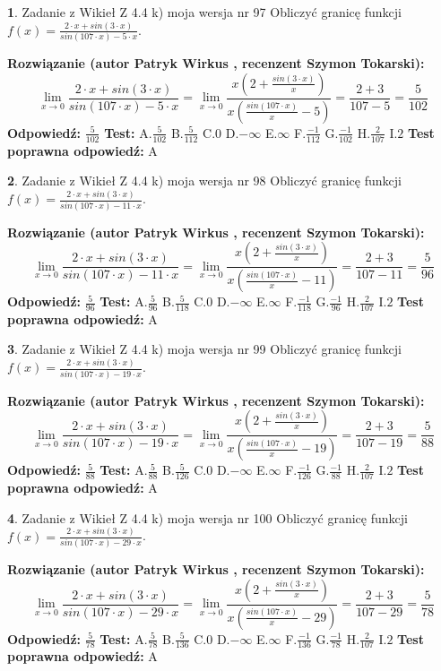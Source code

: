 \documentclass[12pt, a4paper]{article}
\theoremstyle{definition} %
\newtheorem{zad}{}
\newcommand{\zadStart}[1]{\begin{zad}#1\newline}
\newcommand{\zadStop}{\end{zad}}
\newcommand{\rozwStart}[2]{\noindent \textbf{Rozwiązanie (autor #1 , recenzent #2): }\newline}
\newcommand{\rozwStop}{\newline}
\newcommand{\odpStart}{\noindent \textbf{Odpowiedź:}\newline}
\newcommand{\odpStop}{\newline}
\newcommand{\testStart}{\noindent \textbf{Test:}\newline}
\newcommand{\testStop}{\newline}
\newcommand{\kluczStart}{\noindent \textbf{Test poprawna odpowiedź:}\newline}
\newcommand{\kluczStop}{\newline}
\begin{document}
\zadStart{Zadanie z Wikieł Z 4.4 k) moja wersja nr 97}
Obliczyć granicę funkcji $f(x)=\frac{2\cdot x +sin(3\cdot x)}{sin(107\cdot x) -5\cdot x}$.
\zadStop
\rozwStart{Patryk Wirkus}{Szymon Tokarski}
$$\lim\limits_{x\to 0}\frac{2\cdot x +sin(3\cdot x)}{sin(107\cdot x) -5\cdot x}
=\lim\limits_{x\to 0}\frac{x(2+\frac{sin(3\cdot x)}{x})}{x(\frac{sin(107\cdot x)}{x}-5)}
=\frac{2+3}{107-5} = \frac{5}{102}$$
\rozwStop
\odpStart
$\frac{5}{102}$
\odpStop
\testStart
A.$\frac{5}{102}$
B.$\frac{5}{112}$
C.$0$
D.$-\infty$
E.$\infty$
F.$\frac{-1}{112}$
G.$\frac{-1}{102}$
H.$\frac{2}{107}$
I.$2$
\testStop
\kluczStart
A
\kluczStop



\zadStart{Zadanie z Wikieł Z 4.4 k) moja wersja nr 98}
Obliczyć granicę funkcji $f(x)=\frac{2\cdot x +sin(3\cdot x)}{sin(107\cdot x) -11\cdot x}$.
\zadStop
\rozwStart{Patryk Wirkus}{Szymon Tokarski}
$$\lim\limits_{x\to 0}\frac{2\cdot x +sin(3\cdot x)}{sin(107\cdot x) -11\cdot x}
=\lim\limits_{x\to 0}\frac{x(2+\frac{sin(3\cdot x)}{x})}{x(\frac{sin(107\cdot x)}{x}-11)}
=\frac{2+3}{107-11} = \frac{5}{96}$$
\rozwStop
\odpStart
$\frac{5}{96}$
\odpStop
\testStart
A.$\frac{5}{96}$
B.$\frac{5}{118}$
C.$0$
D.$-\infty$
E.$\infty$
F.$\frac{-1}{118}$
G.$\frac{-1}{96}$
H.$\frac{2}{107}$
I.$2$
\testStop
\kluczStart
A
\kluczStop



\zadStart{Zadanie z Wikieł Z 4.4 k) moja wersja nr 99}
Obliczyć granicę funkcji $f(x)=\frac{2\cdot x +sin(3\cdot x)}{sin(107\cdot x) -19\cdot x}$.
\zadStop
\rozwStart{Patryk Wirkus}{Szymon Tokarski}
$$\lim\limits_{x\to 0}\frac{2\cdot x +sin(3\cdot x)}{sin(107\cdot x) -19\cdot x}
=\lim\limits_{x\to 0}\frac{x(2+\frac{sin(3\cdot x)}{x})}{x(\frac{sin(107\cdot x)}{x}-19)}
=\frac{2+3}{107-19} = \frac{5}{88}$$
\rozwStop
\odpStart
$\frac{5}{88}$
\odpStop
\testStart
A.$\frac{5}{88}$
B.$\frac{5}{126}$
C.$0$
D.$-\infty$
E.$\infty$
F.$\frac{-1}{126}$
G.$\frac{-1}{88}$
H.$\frac{2}{107}$
I.$2$
\testStop
\kluczStart
A
\kluczStop



\zadStart{Zadanie z Wikieł Z 4.4 k) moja wersja nr 100}
Obliczyć granicę funkcji $f(x)=\frac{2\cdot x +sin(3\cdot x)}{sin(107\cdot x) -29\cdot x}$.
\zadStop
\rozwStart{Patryk Wirkus}{Szymon Tokarski}
$$\lim\limits_{x\to 0}\frac{2\cdot x +sin(3\cdot x)}{sin(107\cdot x) -29\cdot x}
=\lim\limits_{x\to 0}\frac{x(2+\frac{sin(3\cdot x)}{x})}{x(\frac{sin(107\cdot x)}{x}-29)}
=\frac{2+3}{107-29} = \frac{5}{78}$$
\rozwStop
\odpStart
$\frac{5}{78}$
\odpStop
\testStart
A.$\frac{5}{78}$
B.$\frac{5}{136}$
C.$0$
D.$-\infty$
E.$\infty$
F.$\frac{-1}{136}$
G.$\frac{-1}{78}$
H.$\frac{2}{107}$
I.$2$
\testStop
\kluczStart
A
\kluczStop
\end{document}

